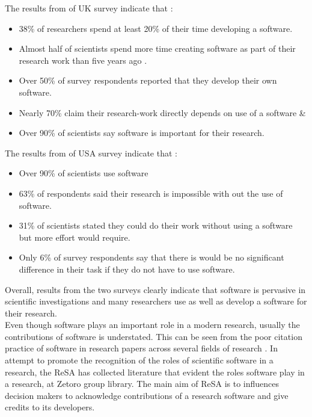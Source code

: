 \noindent The results from of \ac{UK} survey indicate that \citep{hettrick2014uk}:
\begin{itemize}%
	\itemsep0em 
	\item 38\% of researchers spend at least 20\% of their time developing a software.
	\item Almost half of scientists spend more time creating software as part of their research work than five years ago .
	\item Over 50\% of survey respondents reported that they develop their own software. 
	\item Nearly 70\% claim their research-work directly depends on use of a software \&
	\item Over 90\% of scientists say software is important for their research. \\
\end{itemize}

\noindent The results from of \ac{USA} survey indicate that \citep{nangia2017track}:
\begin{itemize}%
	\itemsep0em
	\item Over 90\% of scientists use software 
	\item 63\% of respondents said their research is impossible with out the use of software.
	\item 31\% of scientists stated they could do their work without using a software but more effort would require.
	\item Only 6\% of survey respondents say that there is would be no significant difference in their task if they do not have to use software. 
	
\end{itemize}

Overall, results from the two surveys clearly indicate that software is pervasive in scientific investigations and many researchers use as well as develop a software for their research. \\

Even though software plays an important role in a modern research, usually the contributions of software is understated. This can be seen from the poor citation practice of software in research papers across several fields of research \citep{schindler2021somesci,yang2018important, pan2016disciplinary}.  In attempt to promote the recognition of the roles of scientific software in a research, the \ac{ReSA} has collected literature that evident the roles software play in a research, at Zetoro group library. The main aim of \ac{ReSA} is to influences decision makers to acknowledge contributions of a research software and give credits to its developers.\\


